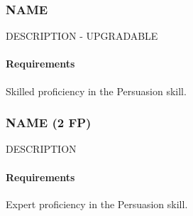 \subsubsection{NAME} \label{feat::name}
    DESCRIPTION - UPGRADABLE
    \paragraph{Requirements} Skilled proficiency in the Persuasion skill.
\subsubsection{NAME (2 FP)} \label{feat::name}
    DESCRIPTION
    \paragraph{Requirements} Expert proficiency in the Persuasion skill.

